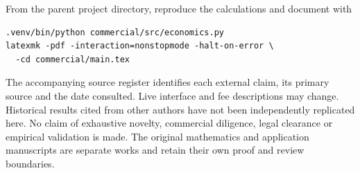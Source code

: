 \documentclass[11pt]{article}
\theoremstyle{remark}\newtheorem{example}{Example}
\begin{document}
From the parent project directory, reproduce the calculations and document with
\begin{verbatim}
.venv/bin/python commercial/src/economics.py
latexmk -pdf -interaction=nonstopmode -halt-on-error \
  -cd commercial/main.tex
\end{verbatim}
The accompanying source register identifies each external claim, its primary
source and the date consulted. Live interface and fee descriptions may change.
Historical results cited from other authors have not been independently
replicated here. No claim of exhaustive novelty, commercial diligence, legal
clearance or empirical validation is made. The original mathematics
and application manuscripts are separate works and retain their own proof and
review boundaries.



\end{document}
